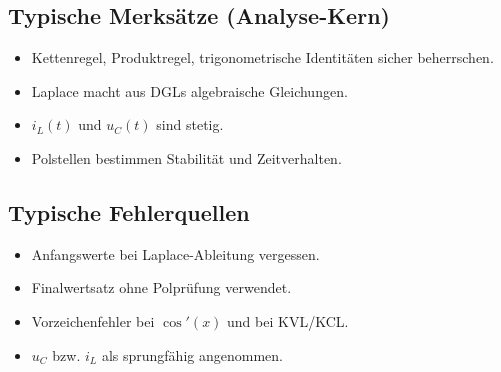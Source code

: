 \subsection{Typische Merksätze (Analyse-Kern)}

\begin{itemize}
    \item Kettenregel, Produktregel, trigonometrische Identitäten sicher beherrschen.
    \item Laplace macht aus DGLs algebraische Gleichungen.
    \item $i_L(t)$ und $u_C(t)$ sind stetig.
    \item Polstellen bestimmen Stabilität und Zeitverhalten.
\end{itemize}
\subsection{Typische Fehlerquellen}

\begin{itemize}
    \item Anfangswerte bei Laplace-Ableitung vergessen.
    \item Finalwertsatz ohne Polprüfung verwendet.
    \item Vorzeichenfehler bei $\cos'(x)$ und bei KVL/KCL.
    \item $u_C$ bzw. $i_L$ als sprungfähig angenommen.
\end{itemize}
